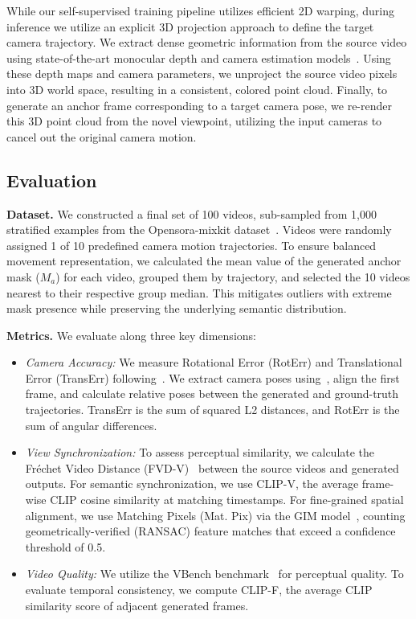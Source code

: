 While our self-supervised training pipeline utilizes efficient 2D warping, during inference we utilize an explicit 3D projection approach to define the target camera trajectory. We extract dense geometric information from the source video using state-of-the-art monocular depth and camera estimation models~\cite{huang2025vipe, xu2025geometrycrafter, 4d_recon_hu2025depthcrafter}. Using these depth maps and camera parameters, we unproject the source video pixels into 3D world space, resulting in a consistent, colored point cloud. Finally, to generate an anchor frame corresponding to a target camera pose, we re-render this 3D point cloud from the novel viewpoint, utilizing the input cameras to cancel out the original camera motion.

\subsection{Evaluation}

\textbf{Dataset.} We constructed a final set of 100 videos, sub-sampled from 1,000 stratified examples from the Opensora-mixkit dataset~\cite{lin2024open}. Videos were randomly assigned 1 of 10 predefined camera motion trajectories. To ensure balanced movement representation, we calculated the mean value of the generated anchor mask ($M_a$) for each video, grouped them by trajectory, and selected the 10 videos nearest to their respective group median. This mitigates outliers with extreme mask presence while preserving the underlying semantic distribution.

\textbf{Metrics.} We evaluate along three key dimensions:
\begin{itemize}[noitemsep, topsep=0pt]
    \item \textit{Camera Accuracy:} We measure Rotational Error (RotErr) and Translational Error (TransErr) following~\cite{camera_traj_he2024cameractrl}. We extract camera poses using~\cite{huang2025vipe}, align the first frame, and calculate relative poses between the generated and ground-truth trajectories. TransErr is the sum of squared L2 distances, and RotErr is the sum of angular differences.
    \item \textit{View Synchronization:} To assess perceptual similarity, we calculate the Fréchet Video Distance (FVD-V)~\cite{eval_unterthiner2019fvd} between the source videos and generated outputs. For semantic synchronization, we use CLIP-V, the average frame-wise CLIP cosine similarity at matching timestamps. For fine-grained spatial alignment, we use Matching Pixels (Mat. Pix) via the GIM model~\cite{eval_matpix}, counting geometrically-verified (RANSAC) feature matches that exceed a confidence threshold of 0.5.
    \item \textit{Video Quality:} We utilize the VBench benchmark~\cite{eval_huang2024vbench} for perceptual quality. To evaluate temporal consistency, we compute CLIP-F, the average CLIP similarity score of adjacent generated frames.
\end{itemize}


